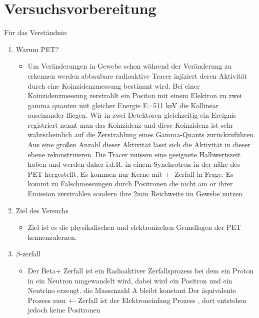 \documentclass{article}
\begin{document}
    \section{Versuchsvorbereitung}
        Für das Verständnis:
        \begin{enumerate}
            \item Warum PET?
            \begin{itemize}
                \item Um Veränderungen in Gewebe schon während der Veränderung zu erkennen werden abbaubare radioaktive Tracer injiziert deren Aktivität durch eine Koinzidenzmessung bestimmt wird.
                Bei einer Koinzidenzmessung zerstrahlt ein Positon mit einem Elektron zu zwei gamma quanten mit gleicher Energie E=511 keV die Kollinear auseinander fliegen. Wir in zwei Detektoren 
                gleichzeitig ein Ereignis registriert nennt man das Koinzidenz und diese Koinzidenz ist sehr wahrscheinlich auf die Zerstrahlung eines Gamma-Quants zurückzuführen.
                Aus eine großen Anzahl dieser Aktivität lässt sich die Aktivität in dieser ebene rekonstruieren.
                Die Tracer müssen eine geeignete Halbwertszeit haben und werden daher i.d.R. in einem Synchrotron in der nähe des PET hergestellt.
                Es kommen nur Kerne mit \beta +- Zerfall in Frage.
                Es kommt zu Falschmessungen durch Positronen die nicht am or ihrer Emission zerstrahlen sondern ihre 2mm Reichweite im Gewebe nutzen
            \end{itemize}
            
            \item Ziel des Versuchs
            \begin{itemize}
                \item Ziel ist es die physikalischen und elektronischen Grundlagen der PET kennenzulernen.
            \end{itemize}

            \item $\beta$-zerfall
            \begin{itemize}
                \item Der Beta+ Zerfall ist ein Radioaktiver Zerfallsprozess bei dem ein Proton in ein Neutron umgewandelt wird, dabei wird ein Positron und ein Neutrino erzeugt.
                die Massenzahl A bleibt konstant
                Der äquivalente Prozess zum \beta +- Zerfall ist der Elektroneinfang Prozess , dort entstehen jedoch keine Positronen
            \end{itemize}


\end{enumerate}
\end{document}
